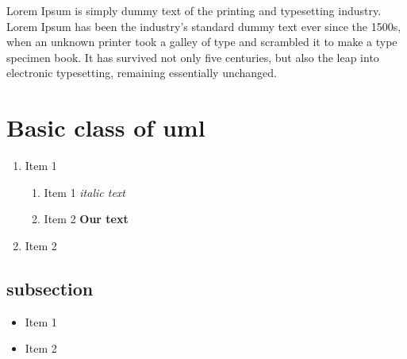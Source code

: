 \documentclass[a4paper,12pt]{article}
\begin{document}
\RapPage
Lorem Ipsum is simply dummy text of the printing and typesetting industry. Lorem Ipsum has been the industry's standard dummy text ever since the 1500s, when an unknown printer took a galley of type and scrambled it to make a type specimen book. It has survived not only five centuries, but also the leap into electronic typesetting, remaining essentially unchanged. 

\section{Basic class of uml}

\begin{enumerate}
\item Item 1
\begin{enumerate}
\item Item 1 \textit{italic  text}
\item Item 2 \textbf{Our text}
\end{enumerate}
\item Item 2
\end{enumerate}
\subsection{subsection}
\begin{itemize}
\item Item 1
\item Item 2
\end{itemize}
\end{document}
